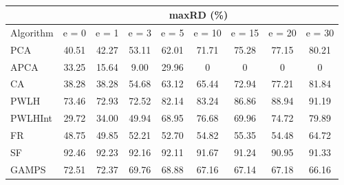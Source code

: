 \begin{table}[h]
\newcommand{\cpca}{\cellcolor{cyan!20}}
\newcommand{\capca}{\cellcolor{green!20}}
\newcommand{\cfr}{\cellcolor{yellow!25}}
\newcommand{\cgzip}{\cellcolor{orange!20}}
\newcommand{\best}{\cellcolor{gray!30}}
\centering\hspace*{0cm}\begin{tabular}{| l | c | c | c | c | c | c | c | c |}\cline{2-9}\multicolumn{1}{c|}{}& \multicolumn{8}{c|}{maxRD (\%)}\\\hline
{Algorithm} & {e = 0} & {e = 1} & {e = 3} & {e = 5} & {e = 10} & {e = 15} & {e = 20} & {e = 30} \\\hline
{PCA\cpca} & {40.51} & {42.27} & {53.11} & {62.01} & {71.71} & {75.28} & {77.15} & {80.21} \\\hline
{APCA\capca} & {33.25} & {\best15.64} & {\best9.00} & {\best29.96} & {\best0} & {\best0} & {\best0} & {\best0} \\\hline
{CA} & {38.28} & {38.28} & {54.68} & {63.12} & {65.44} & {72.94} & {77.21} & {81.84} \\\hline
{PWLH} & {73.46} & {72.93} & {72.52} & {82.14} & {83.24} & {86.86} & {88.94} & {91.19} \\\hline
{PWLHInt} & {\best29.72} & {34.00} & {49.94} & {68.95} & {76.68} & {69.96} & {74.72} & {79.89} \\\hline
{FR\cfr} & {48.75} & {49.85} & {52.21} & {52.70} & {54.82} & {55.35} & {54.48} & {64.72} \\\hline
{SF} & {92.46} & {92.23} & {92.16} & {92.11} & {91.67} & {91.24} & {90.95} & {91.33} \\\hline
{GAMPS} & {72.51} & {72.37} & {69.76} & {68.88} & {67.16} & {67.14} & {67.18} & {66.16} \\\hline
\end{tabular}
\caption{\captionminmaxone}
\label{experiments:minmaxone}
\end{table}
